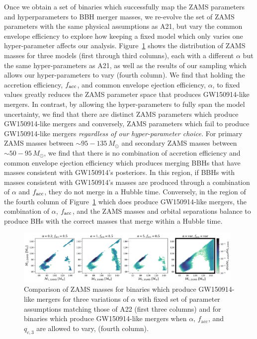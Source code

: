 \documentclass[twocolumn]{aastex631}
\newcommand{\kw}[1]{{\color{rb4}[KW: #1 ]}}
\newcommand{\kb}[1]{\textcolor{pink}{#1}}
\begin{document}
Once we obtain a set of binaries which successfully map the ZAMS parameters and hyperparameters to BBH merger masses, 
we re-evolve the set of ZAMS parameters with the same physical assumptions as A21, but vary the common envelope efficiency 
to explore how keeping a fixed model which only varies one hyper-parameter affects our analysis. 
Figure~\ref{fig:compare_fixed_variable} shows the distribution of ZAMS masses for three models (first through third columns), 
each with a different $\alpha$ but the same hyper-parameters as A21, 
as well as the results of our sampling which allows our hyper-parameters to vary (fourth column). We find that holding the accretion 
efficiency, $f_{\rm{acc}}$, and common envelope ejection efficiency, $\alpha$, to fixed values greatly reduces the ZAMS parameter space 
that produces GW150914-like mergers. In contrast, by allowing the hyper-parameters to fully span the model uncertainty, we 
find that there are distinct ZAMS parameters which produce GW150914-like mergers and conversely, ZAMS parameters which 
fail to produce GW150914-like mergers \emph{regardless of our hyper-parameter choice.} For primary ZAMS masses between 
$\sim95-135\,M_{\odot}$ and secondary ZAMS masses between $\sim50-95\,M_{\odot}$, we find that there is no combination of accretion
efficiency and common envelope ejection efficiency which produces merging BBHs that have masses consistent with GW150914's posteriors.
In this region, if BBHs with masses consistent with GW150914's masses are produced through a combination of $\alpha$ and 
$f_{\rm{acc}}$, they do not merge in a Hubble time. Conversely, in the region of the fourth column of Figure~\ref{fig:compare_fixed_variable}
which does produce GW150914-like mergers, the combination of $\alpha$, $f_{\rm{acc}}$, and the ZAMS masses and orbital separations 
balance to produce BHs with the correct masses that merge within a Hubble time.


\begin{figure}
    \includegraphics[width=0.98\textwidth]{static/compare_fixed_variable.png}
    \caption{Comparison of ZAMS masses for binaries which produce GW150914-like mergers for three variations of $\alpha$
     with fixed set of parameter assumptions matching those of A22 (first three columns) and for binaries which produce 
     GW150914-like mergers when $\alpha$, $f_{\mathrm{acc}}$, and $q_{c,3}$ are allowed to vary, (fourth column).}
    \label{fig:compare_fixed_variable}
\end{figure}
\end{document}
